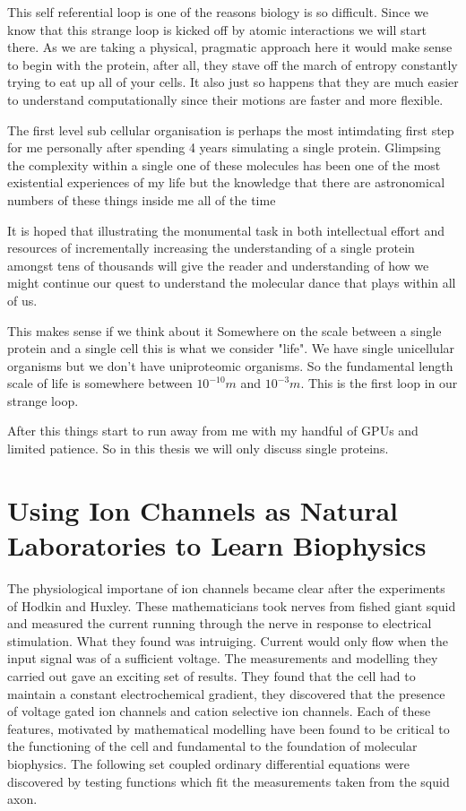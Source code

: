 This self referential loop is one of the reasons biology is so difficult. Since we know that this strange loop is kicked off by atomic interactions we will start there. As we are taking a physical, pragmatic approach here it would make sense to begin with the protein, after all, they stave off the march of entropy constantly trying to eat up all of your cells. It also just so happens that they are much easier to understand computationally since their motions are faster and more flexible. 

The first level sub cellular organisation is perhaps the most intimdating first step for me personally after spending 4 years simulating a single protein. Glimpsing the complexity within a single one of these molecules has been one of the most existential experiences of my life but the knowledge that there are astronomical numbers of these things inside me all of the time 

It is hoped that illustrating the monumental task in both intellectual effort and resources of incrementally increasing the understanding of a single protein amongst tens of thousands will give the reader and understanding of how we might continue our quest to understand the molecular dance that plays within all of us.  
 
This makes sense if we think about it 
Somewhere on the scale between a single protein and a single cell this is what we consider "life". We have single unicellular organisms but we don't have uniproteomic organisms. So the fundamental length scale of life is somewhere between $10^{-10}m$ and $10^{-3}m$. This is the first loop in our strange loop.

After this things start to run away from me with my handful of GPUs and limited patience. So in this thesis we will only discuss single proteins.


\section{Using Ion Channels as Natural Laboratories to Learn Biophysics}
The physiological importane of ion channels became clear after the experiments of Hodkin and Huxley. These mathematicians took nerves from fished giant squid and measured the current running through the nerve in response to electrical stimulation. What they found was intruiging. Current would only flow when the input signal was of a sufficient voltage. The measurements and modelling they carried out gave an exciting set of results. They found that the cell had to maintain a constant electrochemical gradient, they discovered that the presence of voltage gated ion channels and cation selective ion channels\cite{hodgkin1952}. Each of these features, motivated by mathematical modelling have been found to be critical to the functioning of the cell and fundamental to the foundation of molecular biophysics. The following set coupled ordinary differential equations were discovered by testing functions which fit the measurements taken from the squid axon.   

